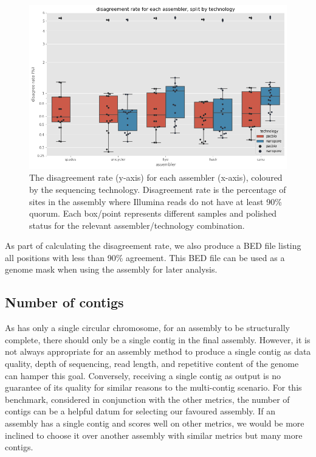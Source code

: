 \begin{figure}
\includegraphics[width=1.0\textwidth]{Appendix1/Figs/disagree_rate.png}
\centering
\caption{The disagreement rate (y-axis) for each assembler (x-axis), coloured by the sequencing technology. Disagreement rate is the percentage of sites in the assembly where Illumina reads do not have at least 90\% quorum. Each box/point represents different samples and polished status for the relevant assembler/technology combination.}
\label{fig:disagree_rate}
\end{figure}

As part of calculating the disagreement rate, we also produce a BED file listing all positions with less than 90\% agreement. This BED file can be used as a genome mask when using the assembly for later analysis.

\subsection{Number of contigs}

As \mtb{} has only a single circular chromosome, for an assembly to be structurally complete, there should only be a single contig in the final assembly. However, it is not always appropriate for an assembly method to produce a single contig as data quality, depth of sequencing, read length, and repetitive content of the genome can hamper this goal. Conversely, receiving a single contig as output is no guarantee of its quality for similar reasons to the multi-contig scenario. For this benchmark, considered in conjunction with the other metrics, the number of contigs can be a helpful datum for selecting our favoured assembly. If an assembly has a single contig and scores well on other metrics, we would be more inclined to choose it over another assembly with similar metrics but many more contigs.

